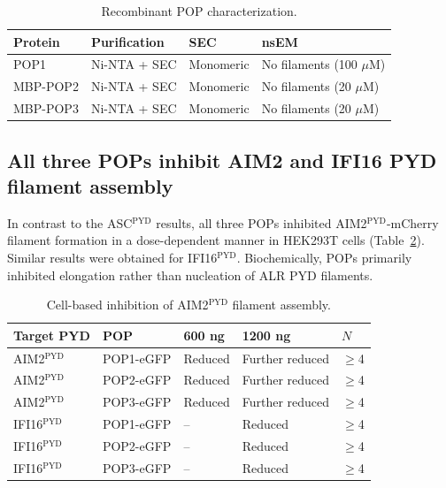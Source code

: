 \documentclass[11pt,a4paper]{article}
\begin{document}
\begin{table}[htbp]
\centering
\caption{Recombinant POP characterization.}
\label{tab:pop_char}
\begin{tabular}{llll}
\toprule
\textbf{Protein} & \textbf{Purification} & \textbf{SEC} & \textbf{nsEM} \\
\midrule
POP1 & Ni-NTA + SEC & Monomeric & No filaments (100 $\mu$M) \\
MBP-POP2 & Ni-NTA + SEC & Monomeric & No filaments (20 $\mu$M) \\
MBP-POP3 & Ni-NTA + SEC & Monomeric & No filaments (20 $\mu$M) \\
\bottomrule
\end{tabular}
\end{table}

\subsection{All three POPs inhibit AIM2 and IFI16 PYD filament assembly}

In contrast to the ASC$^{\text{PYD}}$ results, all three POPs inhibited AIM2$^{\text{PYD}}$-mCherry filament formation in a dose-dependent manner in HEK293T cells (Table~\ref{tab:aim2_cell}). Similar results were obtained for IFI16$^{\text{PYD}}$. Biochemically, POPs primarily inhibited elongation rather than nucleation of ALR PYD filaments.

\begin{table}[htbp]
\centering
\caption{Cell-based inhibition of AIM2$^{\text{PYD}}$ filament assembly.}
\label{tab:aim2_cell}
\small
\begin{tabular}{lllll}
\toprule
\textbf{Target PYD} & \textbf{POP} & \textbf{600 ng} & \textbf{1200 ng} & \textbf{$N$} \\
\midrule
AIM2$^{\text{PYD}}$ & POP1-eGFP & Reduced & Further reduced & $\geq$4 \\
AIM2$^{\text{PYD}}$ & POP2-eGFP & Reduced & Further reduced & $\geq$4 \\
AIM2$^{\text{PYD}}$ & POP3-eGFP & Reduced & Further reduced & $\geq$4 \\
IFI16$^{\text{PYD}}$ & POP1-eGFP & -- & Reduced & $\geq$4 \\
IFI16$^{\text{PYD}}$ & POP2-eGFP & -- & Reduced & $\geq$4 \\
IFI16$^{\text{PYD}}$ & POP3-eGFP & -- & Reduced & $\geq$4 \\
\bottomrule
\end{tabular}
\end{table}
\end{document}
